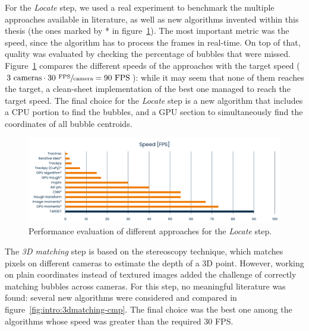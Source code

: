 
For the \textit{Locate} step, we used a real experiment to benchmark the multiple approaches available in literature, as well as new algorithms invented within this thesis (the ones marked by * in figure~\ref{fig:intro:locate-speed}).
The most important metric was the speed, since the algorithm has to process the frames in real-time.
On top of that, quality was evaluated by checking the percentage of bubbles that were missed.
Figure~\ref{fig:intro:locate-speed} compares the different speeds of the approaches with the target speed ($3~\textnormal{cameras} \cdot 30~\sfrac{\textnormal{FPS}}{\textnormal{camera}} = 90~\textnormal{FPS}$): while it may seem that none of them reaches the target, a clean-sheet implementation of the best one managed to reach the target speed.
The final choice for the \textit{Locate} step is a new algorithm that includes a CPU portion to find the bubbles, and a GPU section to simultaneously find the coordinates of all bubble centroids.

\begin{figure}
	\centerline{\includegraphics[width=\textwidth]{images/locate-speed-comparison.png}}
	\caption{\centering Performance evaluation of different approaches for the \textit{Locate} step.}
	\label{fig:intro:locate-speed}
\end{figure}

The \textit{3D matching} step is based on the stereoscopy technique, which matches pixels on different cameras to estimate the depth of a 3D point.
However, working on plain coordinates instead of textured images added the challenge of correctly matching bubbles across cameras.
For this step, no meaningful literature was found: several new algorithms were considered and compared in figure~\ref{fig:intro:3dmatching-cmp}.
The final choice was the best one among the algorithms whose speed was greater than the required 30 FPS.

